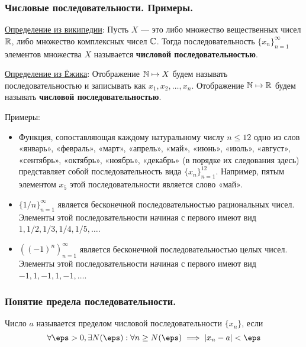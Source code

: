 \documentclass[12pt, a4paper]{article}
\begin{document}
	\subsubsection{Числовые последовательности. Примеры.}
	\underline{Определение из википедии}: Пусть $X$ --- это либо множество вещественных чисел $\mathbb{R}$, либо множество комплексных чисел $\mathbb{C}$. Тогда последовательность $\{x_n\}_{n = 1}^{\infty}$ элементов множества $X$ называется \textbf{числовой последовательностью}.

	\underline{Определение из Ёжика}: Отображение $\mathbb{N} \mapsto X$ будем называть последовательностью и записывать как $x_1, x_2, \dots, x_n$. Отображение $\mathbb{N} \mapsto \mathbb{R}$ будем называть \textbf{числовой последовательностью}.

	Примеры:
	\begin{itemize}
		\item
		Функция, сопоставляющая каждому натуральному числу $n \leq 12$ одно из слов «январь», «февраль», «март», «апрель», «май», «июнь», «июль», «август», «сентябрь», «октябрь», «ноябрь», «декабрь» (в порядке их следования здесь) представляет собой последовательность вида $\{x_n\}_{n=1}^{12}$. Например, пятым элементом $x_5$ этой последовательности является слово «май».

		\item
		$\{1/n\}_{n=1}^{\infty}$ является бесконечной последовательностью рациональных чисел. Элементы этой последовательности начиная с первого имеют вид $1,1/2,1/3,1/4,1/5,\ldots$.

		\item
		$\left((-1)^{n}\right)_{{n=1}}^{{\infty }}$ является бесконечной последовательностью целых чисел. Элементы этой последовательности начиная с первого имеют вид $-1,1,-1,1,-1,\ldots$.
	\end{itemize}

	\subsubsection{Понятие предела последовательности.}
	Число $a$ называется пределом числовой последовательности $\{x_n\}$, если
	\begin{equation*}
		\forall \eps > 0, \exists N(\eps): \forall n \geq N(\eps) \implies |x_n - a| < \eps
	\end{equation*}
\end{document}
